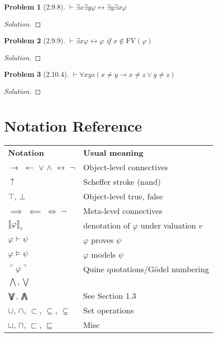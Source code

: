 \documentclass[letter]{article}
\newtheorem{problem}{Problem}
\theoremstyle{definition}
\newenvironment{solution}
{\begin{proof}[Solution]}
        {\end{proof}}
\renewcommand{\phi}{\varphi}
\DeclareMathOperator*{\bigdoublewedge}{\bigwedge\mkern-15mu\bigwedge}
\DeclareMathOperator*{\bigdoublevee}{\bigvee\mkern-15mu\bigvee}
\begin{document}
\begin{problem}[2.9.8]
    $\vdash \exists x \exists y \phi \leftrightarrow \exists y \exists x \phi$
\end{problem}
\begin{solution}
\end{solution}

\begin{problem}[2.9.9]
    $\vdash \exists x \phi \leftrightarrow \phi$ if $x \notin \textrm{FV}(\phi)$
\end{problem}
\begin{solution}
\end{solution}

\begin{problem}[2.10.4]
    $\vdash \forall x y z (x \neq y \to x \neq z \lor y \neq z)$
\end{problem}
\begin{solution}
\end{solution}


\section{Notation Reference}
\begin{table}[H]
    \begin{tabular}{ll}
        \textbf{Notation} & \textbf{Usual meaning} \\
        $\to$ $\leftarrow$ $\lor$ $\land$ $\leftrightarrow$ $\neg$ & Object-level connectives \\
        $\uparrow$ & Scheffer stroke (nand)\\
        $\top$, $\bot$ & Object-level true, false \\
        $\implies$ $\impliedby$ $\iff$ $\neg$ & Meta-level connectives \\

        $\llbracket \phi \rrbracket_v$ & denotation of $\phi$ under valuation $v$\\
        $\phi \vdash \psi$ & $\phi$ proves $\psi$ \\
        $\phi \models \psi$ & $\phi$ models $\psi$ \\
        $\ulcorner \phi \urcorner$ & Quine quotations/G\"odel numbering \\
        $\bigwedge, \bigvee$ & \\
        $\bigdoublevee$, $\bigdoublewedge$ & See Section 1.3 \\
        $\cup$, $\cap$, $\subset$, $\subseteq$, $\subsetneq$ & Set operations \\
        $\sqcup$, $\sqcap$, $\sqsubset$, $\sqsubseteq$ & Misc \\
\end{tabular}
\end{table}
\end{document}
